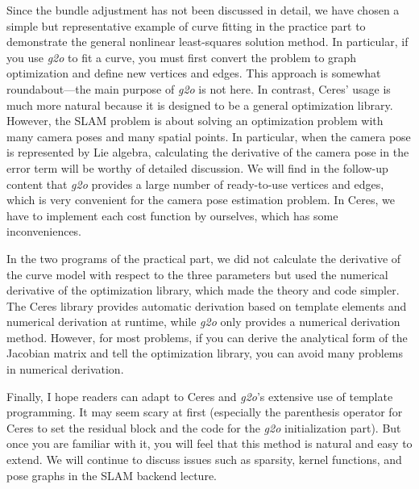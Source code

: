 Since the bundle adjustment has not been discussed in detail, we have chosen a simple but representative example of curve fitting in the practice part to demonstrate the general nonlinear least-squares solution method. In particular, if you use \textit{g2o} to fit a curve, you must first convert the problem to graph optimization and define new vertices and edges. This approach is somewhat roundabout—the main purpose of \textit{g2o} is not here. In contrast, Ceres' usage is much more natural because it is designed to be a general optimization library. However, the SLAM problem is about solving an optimization problem with many camera poses and many spatial points. In particular, when the camera pose is represented by Lie algebra, calculating the derivative of the camera pose in the error term will be worthy of detailed discussion. We will find in the follow-up content that \textit{g2o} provides a large number of ready-to-use vertices and edges, which is very convenient for the camera pose estimation problem. In Ceres, we have to implement each cost function by ourselves, which has some inconveniences.

In the two programs of the practical part, we did not calculate the derivative of the curve model with respect to the three parameters but used the numerical derivative of the optimization library, which made the theory and code simpler. The Ceres library provides automatic derivation based on template elements and numerical derivation at runtime, while \textit{g2o} only provides a numerical derivation method. However, for most problems, if you can derive the analytical form of the Jacobian matrix and tell the optimization library, you can avoid many problems in numerical derivation.

Finally, I hope readers can adapt to Ceres and \textit{g2o}'s extensive use of template programming. It may seem scary at first (especially the parenthesis operator for Ceres to set the residual block and the code for the \textit{g2o} initialization part). But once you are familiar with it, you will feel that this method is natural and easy to extend. We will continue to discuss issues such as sparsity, kernel functions, and pose graphs in the SLAM backend lecture.


